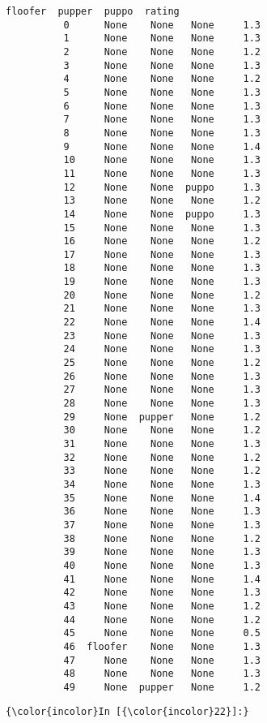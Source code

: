 \documentclass[11pt]{article}
\begin{document}
\begin{Verbatim}[commandchars=\\\{\}]
              floofer  pupper  puppo  rating  
          0      None    None   None     1.3  
          1      None    None   None     1.3  
          2      None    None   None     1.2  
          3      None    None   None     1.3  
          4      None    None   None     1.2  
          5      None    None   None     1.3  
          6      None    None   None     1.3  
          7      None    None   None     1.3  
          8      None    None   None     1.3  
          9      None    None   None     1.4  
          10     None    None   None     1.3  
          11     None    None   None     1.3  
          12     None    None  puppo     1.3  
          13     None    None   None     1.2  
          14     None    None  puppo     1.3  
          15     None    None   None     1.3  
          16     None    None   None     1.2  
          17     None    None   None     1.3  
          18     None    None   None     1.3  
          19     None    None   None     1.3  
          20     None    None   None     1.2  
          21     None    None   None     1.3  
          22     None    None   None     1.4  
          23     None    None   None     1.3  
          24     None    None   None     1.3  
          25     None    None   None     1.2  
          26     None    None   None     1.3  
          27     None    None   None     1.3  
          28     None    None   None     1.3  
          29     None  pupper   None     1.2  
          30     None    None   None     1.2  
          31     None    None   None     1.3  
          32     None    None   None     1.2  
          33     None    None   None     1.2  
          34     None    None   None     1.3  
          35     None    None   None     1.4  
          36     None    None   None     1.3  
          37     None    None   None     1.3  
          38     None    None   None     1.2  
          39     None    None   None     1.3  
          40     None    None   None     1.3  
          41     None    None   None     1.4  
          42     None    None   None     1.3  
          43     None    None   None     1.2  
          44     None    None   None     1.2  
          45     None    None   None     0.5  
          46  floofer    None   None     1.3  
          47     None    None   None     1.3  
          48     None    None   None     1.3  
          49     None  pupper   None     1.2  
\end{Verbatim}
            
    \begin{Verbatim}[commandchars=\\\{\}]
{\color{incolor}In [{\color{incolor}22}]:} 
\end{Verbatim}
\end{document}
